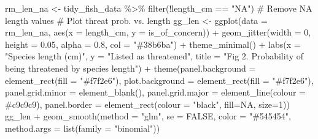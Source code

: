 \documentclass[
  letterpaper,
  DIV=11,
  numbers=noendperiod]{scrartcl}
\newenvironment{Shaded}{\begin{snugshade}}{\end{snugshade}}
\newcommand{\AttributeTok}[1]{\textcolor[rgb]{0.40,0.45,0.13}{#1}}
\newcommand{\CommentTok}[1]{\textcolor[rgb]{0.37,0.37,0.37}{#1}}
\newcommand{\ConstantTok}[1]{\textcolor[rgb]{0.56,0.35,0.01}{#1}}
\newcommand{\DecValTok}[1]{\textcolor[rgb]{0.68,0.00,0.00}{#1}}
\newcommand{\FloatTok}[1]{\textcolor[rgb]{0.68,0.00,0.00}{#1}}
\newcommand{\FunctionTok}[1]{\textcolor[rgb]{0.28,0.35,0.67}{#1}}
\newcommand{\NormalTok}[1]{\textcolor[rgb]{0.00,0.23,0.31}{#1}}
\newcommand{\OtherTok}[1]{\textcolor[rgb]{0.00,0.23,0.31}{#1}}
\newcommand{\SpecialCharTok}[1]{\textcolor[rgb]{0.37,0.37,0.37}{#1}}
\newcommand{\StringTok}[1]{\textcolor[rgb]{0.13,0.47,0.30}{#1}}
\begin{document}
\begin{Shaded}
\begin{Highlighting}[]
\NormalTok{rm\_len\_na }\OtherTok{\textless{}{-}}\NormalTok{ tidy\_fish\_data }\SpecialCharTok{\%\textgreater{}\%} 
  \FunctionTok{filter}\NormalTok{(}\SpecialCharTok{!}\NormalTok{length\_cm }\SpecialCharTok{==} \StringTok{"NA"}\NormalTok{) }\CommentTok{\# Remove NA length values}
\CommentTok{\# Plot threat prob. vs. length}
\NormalTok{gg\_len }\OtherTok{\textless{}{-}} \FunctionTok{ggplot}\NormalTok{(}\AttributeTok{data =}\NormalTok{ rm\_len\_na, }\FunctionTok{aes}\NormalTok{(}\AttributeTok{x =}\NormalTok{ length\_cm, }
                             \AttributeTok{y =}\NormalTok{ is\_of\_concern)) }\SpecialCharTok{+}
  \FunctionTok{geom\_jitter}\NormalTok{(}\AttributeTok{width =} \DecValTok{0}\NormalTok{, }\AttributeTok{height =} \FloatTok{0.05}\NormalTok{, }
              \AttributeTok{alpha =} \FloatTok{0.8}\NormalTok{, }\AttributeTok{col =} \StringTok{"\#38b6ba"}\NormalTok{) }\SpecialCharTok{+}
  \FunctionTok{theme\_minimal}\NormalTok{() }\SpecialCharTok{+}
  \FunctionTok{labs}\NormalTok{(}\AttributeTok{x =} \StringTok{"Species length (cm)"}\NormalTok{, }
       \AttributeTok{y =} \StringTok{"Listed as threatened"}\NormalTok{, }
       \AttributeTok{title =} \StringTok{"Fig 2. Probability of being threatened by species length"}\NormalTok{) }\SpecialCharTok{+}
  \FunctionTok{theme}\NormalTok{(}\AttributeTok{panel.background =} \FunctionTok{element\_rect}\NormalTok{(}\AttributeTok{fill =} \StringTok{"\#f7f2e6"}\NormalTok{),}
        \AttributeTok{plot.background =} \FunctionTok{element\_rect}\NormalTok{(}\AttributeTok{fill =} \StringTok{"\#f7f2e6"}\NormalTok{),}
        \AttributeTok{panel.grid.minor =} \FunctionTok{element\_blank}\NormalTok{(),}
        \AttributeTok{panel.grid.major =} \FunctionTok{element\_line}\NormalTok{(}\AttributeTok{colour =} \StringTok{\textquotesingle{}\#c9c9c9\textquotesingle{}}\NormalTok{),}
        \AttributeTok{panel.border =} \FunctionTok{element\_rect}\NormalTok{(}\AttributeTok{colour =} \StringTok{"black"}\NormalTok{, }\AttributeTok{fill=}\ConstantTok{NA}\NormalTok{, }\AttributeTok{size=}\DecValTok{1}\NormalTok{))}
\NormalTok{gg\_len }\SpecialCharTok{+} \FunctionTok{geom\_smooth}\NormalTok{(}\AttributeTok{method =} \StringTok{"glm"}\NormalTok{, }
              \AttributeTok{se =} \ConstantTok{FALSE}\NormalTok{, }\AttributeTok{color =} \StringTok{"\#545454"}\NormalTok{, }
              \AttributeTok{method.args =} \FunctionTok{list}\NormalTok{(}\AttributeTok{family =} \StringTok{"binomial"}\NormalTok{))}
\end{Highlighting}
\end{Shaded}
\end{document}
